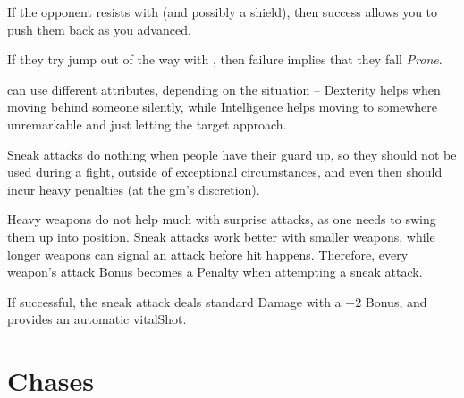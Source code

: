 \begin{multicols}{2}
If the opponent resists with  (and possibly a shield), then success allows you to push them back as you advanced.

If they try jump out of the way with , then failure implies that they fall \textit{Prone}.

\label{sneakattack}
can use different \glspl{attribute}, depending on the situation -- Dexterity helps when moving behind someone silently, while Intelligence helps moving to somewhere unremarkable and just letting the target approach.

Sneak attacks do nothing when people have their guard up, so they should not be used during a fight, outside of exceptional circumstances, and even then should incur heavy penalties (at the \gls{gm}'s discretion).

Heavy weapons do not help much with surprise attacks, as one needs to swing them up into position.
Sneak attacks work better with smaller weapons, while longer weapons can signal an attack before hit happens.
Therefore, every weapon's attack Bonus becomes a Penalty when attempting a sneak attack.

If successful, the sneak attack deals standard Damage with a +2 Bonus, and provides an automatic \gls{vitalShot}.

\stopcontents[Manoeuvres]

\end{multicols}

\section{Chases}
\label{chases}

\chasechart

